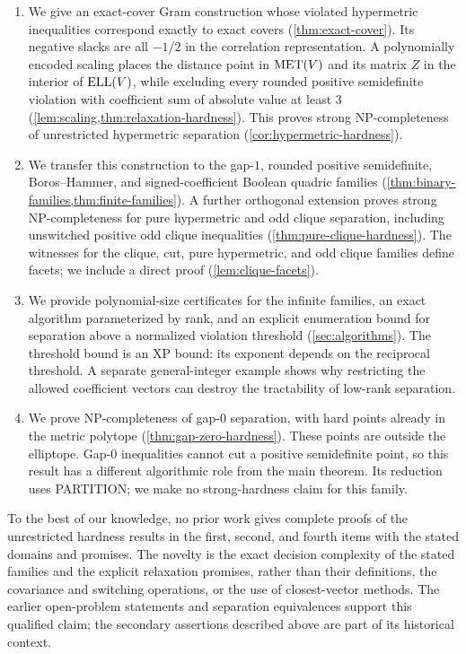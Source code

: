 \begin{enumerate}
\item We give an exact-cover Gram construction whose violated
hypermetric inequalities correspond exactly to exact covers
(\cref{thm:exact-cover}).  Its negative slacks are all $-1/2$ in the
correlation representation.  A polynomially encoded scaling places
the distance point in $\operatorname{MET}(V)$ and its matrix $Z$ in the interior of
$\operatorname{ELL}(V)$, while excluding
every rounded positive semidefinite violation with coefficient sum of
absolute value at least $3$ (\cref{lem:scaling,thm:relaxation-hardness}).
This proves strong NP-completeness of unrestricted hypermetric
separation (\cref{cor:hypermetric-hardness}).

\item We transfer this construction to the gap-$1$, rounded positive
semidefinite, Boros--Hammer, and signed-coefficient Boolean quadric families
(\cref{thm:binary-families,thm:finite-families}).  A further orthogonal
extension proves strong NP-completeness for pure hypermetric and odd
clique separation, including unswitched positive odd clique
inequalities (\cref{thm:pure-clique-hardness}).  The witnesses for the
clique, cut, pure hypermetric, and odd clique families define facets;
we include a direct proof
(\cref{lem:clique-facets}).

\item We provide polynomial-size certificates for the infinite
families, an exact algorithm parameterized by rank, and an explicit
enumeration bound for separation above a normalized violation
threshold (\cref{sec:algorithms}).  The threshold bound is an XP bound:
its exponent depends on the reciprocal threshold.  A separate
general-integer example shows why restricting the allowed coefficient
vectors can destroy the tractability of low-rank separation.

\item We prove NP-completeness of gap-$0$ separation, with hard
points already in the metric polytope (\cref{thm:gap-zero-hardness}).
These points are outside the elliptope.  Gap-$0$ inequalities cannot
cut a positive semidefinite point, so this result has a different
algorithmic role from the main theorem.  Its reduction uses
PARTITION; we make no strong-hardness claim for this family.
\end{enumerate}

To the best of our knowledge, no prior work gives complete proofs of
the unrestricted hardness results in the first, second, and fourth
items with the stated domains and promises.
The novelty is the exact decision complexity of the stated families
and the explicit relaxation promises, rather than their definitions,
the covariance and switching operations, or the use of closest-vector
methods.  The earlier open-problem statements and separation
equivalences support this qualified claim; the secondary assertions
described above are part of its historical context.

